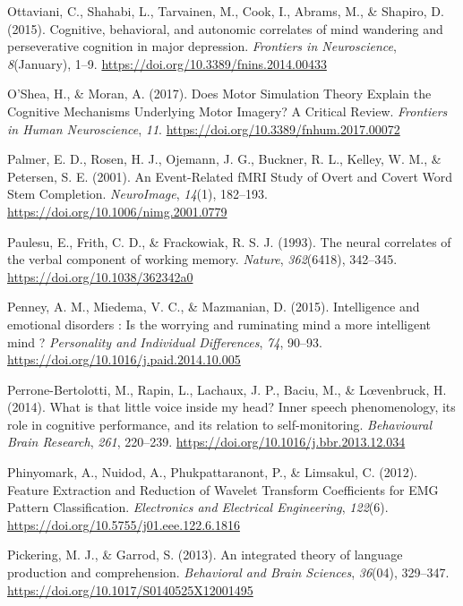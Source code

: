 \documentclass[a4paper,12pt,twoside,openright,oldfontcommands]{memoir}
\begin{document}
\hypertarget{ref-Ottaviani2015}{}
Ottaviani, C., Shahabi, L., Tarvainen, M., Cook, I., Abrams, M., \&
Shapiro, D. (2015). Cognitive, behavioral, and autonomic correlates of
mind wandering and perseverative cognition in major depression.
\emph{Frontiers in Neuroscience}, \emph{8}(January), 1--9.
\url{https://doi.org/10.3389/fnins.2014.00433}

\hypertarget{ref-oshea_does_2017}{}
O'Shea, H., \& Moran, A. (2017). Does Motor Simulation Theory Explain
the Cognitive Mechanisms Underlying Motor Imagery? A Critical Review.
\emph{Frontiers in Human Neuroscience}, \emph{11}.
\url{https://doi.org/10.3389/fnhum.2017.00072}

\hypertarget{ref-palmer_event-related_2001}{}
Palmer, E. D., Rosen, H. J., Ojemann, J. G., Buckner, R. L., Kelley, W.
M., \& Petersen, S. E. (2001). An Event-Related fMRI Study of Overt and
Covert Word Stem Completion. \emph{NeuroImage}, \emph{14}(1), 182--193.
\url{https://doi.org/10.1006/nimg.2001.0779}

\hypertarget{ref-paulesu_neural_1993}{}
Paulesu, E., Frith, C. D., \& Frackowiak, R. S. J. (1993). The neural
correlates of the verbal component of working memory. \emph{Nature},
\emph{362}(6418), 342--345. \url{https://doi.org/10.1038/362342a0}

\hypertarget{ref-Penney2015}{}
Penney, A. M., Miedema, V. C., \& Mazmanian, D. (2015). Intelligence and
emotional disorders : Is the worrying and ruminating mind a more
intelligent mind ? \emph{Personality and Individual Differences},
\emph{74}, 90--93. \url{https://doi.org/10.1016/j.paid.2014.10.005}

\hypertarget{ref-Perrone-Bertolotti2014}{}
Perrone-Bertolotti, M., Rapin, L., Lachaux, J. P., Baciu, M., \&
Lœvenbruck, H. (2014). What is that little voice inside my head? Inner
speech phenomenology, its role in cognitive performance, and its
relation to self-monitoring. \emph{Behavioural Brain Research},
\emph{261}, 220--239. \url{https://doi.org/10.1016/j.bbr.2013.12.034}

\hypertarget{ref-phinyomark_feature_2012}{}
Phinyomark, A., Nuidod, A., Phukpattaranont, P., \& Limsakul, C. (2012).
Feature Extraction and Reduction of Wavelet Transform Coefficients for
EMG Pattern Classification. \emph{Electronics and Electrical
Engineering}, \emph{122}(6).
\url{https://doi.org/10.5755/j01.eee.122.6.1816}

\hypertarget{ref-pickering_integrated_2013}{}
Pickering, M. J., \& Garrod, S. (2013). An integrated theory of language
production and comprehension. \emph{Behavioral and Brain Sciences},
\emph{36}(04), 329--347. \url{https://doi.org/10.1017/S0140525X12001495}
\end{document}
